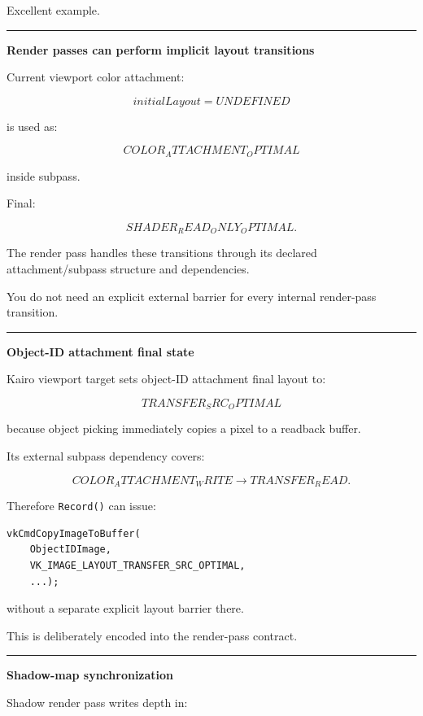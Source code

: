 Excellent example.

\begin{center}\rule{0.5\linewidth}{0.5pt}\end{center}

\textbf{Render passes can perform implicit layout transitions}

Current viewport color attachment:

\[
initialLayout=UNDEFINED
\]

is used as:

\[
COLOR_ATTACHMENT_OPTIMAL
\]

inside subpass.

Final:

\[
SHADER_READ_ONLY_OPTIMAL.
\]

The render pass handles these transitions through its declared attachment/subpass structure and dependencies.

You do not need an explicit external barrier for every internal render-pass transition.

\begin{center}\rule{0.5\linewidth}{0.5pt}\end{center}

\textbf{Object-ID attachment final state}

Kairo viewport target sets object-ID attachment final layout to:

\[
\boxed{
TRANSFER_SRC_OPTIMAL
}
\]

because object picking immediately copies a pixel to a readback buffer.

Its external subpass dependency covers:

\[
COLOR_ATTACHMENT_WRITE
\rightarrow
TRANSFER_READ.
\]

Therefore \texttt{Record()} can issue:

\begin{verbatim}
vkCmdCopyImageToBuffer(
    ObjectIDImage,
    VK_IMAGE_LAYOUT_TRANSFER_SRC_OPTIMAL,
    ...);
\end{verbatim}

without a separate explicit layout barrier there.

This is deliberately encoded into the render-pass contract.

\begin{center}\rule{0.5\linewidth}{0.5pt}\end{center}

\textbf{Shadow-map synchronization}

Shadow render pass writes depth in:

